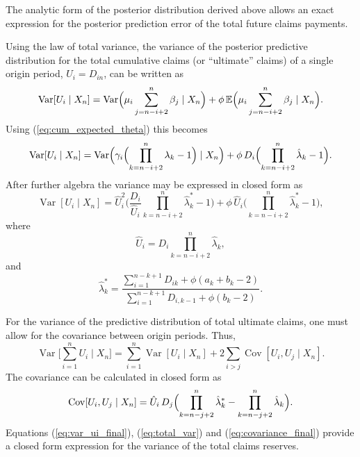\documentclass[aps,pre,draft]{revtex4-2}
\begin{document}
The analytic form of the posterior distribution derived above allows an exact expression for the posterior prediction error of the total future claims payments.

Using the law of total variance, the variance of the posterior predictive distribution for the total cumulative claims (or “ultimate” claims) of a single origin period, $U_i=D_{in}$, can be written as
\begin{equation}\label{eq:var_ui}
\operatorname{Var}[U_i\mid X_n]=\operatorname{Var}\Bigl(\mu_i\sum_{j=n-i+2}^{n}\beta_j\mid X_n\Bigr)+\phi\,\mathbb{E}\Bigl(\mu_i\sum_{j=n-i+2}^{n}\beta_j\mid X_n\Bigr).
\end{equation}
Using (\ref{eq:cum_expected_theta}) this becomes
\begin{equation}\label{eq:var_ui2}
\operatorname{Var}[U_i\mid X_n]=\operatorname{Var}\Bigl(\gamma_i\Bigl(\prod_{k=n-i+2}^{n}\lambda_k-1\Bigr)\mid X_n\Bigr)+\phi\,D_i\Bigl(\prod_{k=n-i+2}^{n}\hat{\lambda}_k-1\Bigr).
\end{equation}
After further algebra the variance may be expressed in closed form as
\begin{equation}\label{eq:var_ui_final}
\operatorname{Var}[U_i\mid X_n]=\hat{U}_i^2\Biggl(\frac{D_i}{\hat{U}_i}\prod_{k=n-i+2}^{n}\hat{\lambda}^*_k-1\Biggr)
+\phi\,\hat{U}_i\Biggl(\prod_{k=n-i+2}^{n}\hat{\lambda}^*_k-1\Biggr),
\end{equation}
where
\begin{equation}\label{eq:U_hat}
\hat{U}_i=D_i\prod_{k=n-i+2}^{n}\hat{\lambda}_k,
\end{equation}
and
\begin{equation}\label{eq:lambda_star}
\hat{\lambda}^*_k=\frac{\sum_{i=1}^{n-k+1}D_{ik}+\phi(a_k+b_k-2)}{\sum_{i=1}^{n-k+1}D_{i,k-1}+\phi(b_k-2)}.
\end{equation}

For the variance of the predictive distribution of total ultimate claims, one must allow for the covariance between origin periods. Thus,
\begin{equation}\label{eq:total_var}
\operatorname{Var}\Biggl[\sum_{i=1}^{n}U_i\mid X_n\Biggr]=\sum_{i=1}^{n}\operatorname{Var}[U_i\mid X_n]
+2\sum_{i>j}\operatorname{Cov}[U_i,U_j\mid X_n].
\end{equation}
The covariance can be calculated in closed form as
\begin{equation}\label{eq:covariance_final}
\operatorname{Cov}[U_i,U_j\mid X_n]=\hat{U}_i\,D_j\Bigl(\prod_{k=n-j+2}^{n}\hat{\lambda}^*_k-\prod_{k=n-j+2}^{n}\hat{\lambda}_k\Bigr).
\end{equation}
Equations (\ref{eq:var_ui_final}), (\ref{eq:total_var}) and (\ref{eq:covariance_final}) provide a closed form expression for the variance of the total claims reserves.
\end{document}
